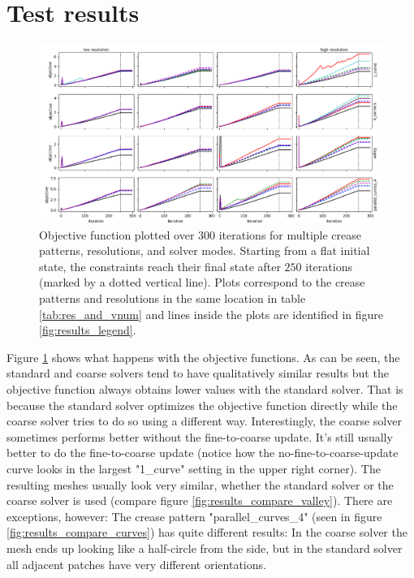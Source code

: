 \documentclass[a4paper,twoside,12pt,nochapterprefix]{scrbook}
\begin{document}
\section{Test results}\label{sec:test_results}
\begin{figure}
    \centering
    \includegraphics[width=1\linewidth]{figures/0318_plotblock}
    \caption{Objective function plotted over $300$ iterations for multiple crease patterns, resolutions, and solver modes. Starting from a flat initial state, the constraints reach their final state after $250$ iterations (marked by a dotted vertical line). Plots correspond to the crease patterns and resolutions in the same location in table \ref{tab:res_and_vnum} and lines inside the plots are identified in figure \ref{fig:results_legend}.}
      \label{fig:results_plotblock}
\end{figure}
Figure \ref{fig:results_plotblock} shows what happens with the objective functions. As can be seen, the standard and coarse solvers tend to have qualitatively similar results but the objective function always obtains lower values with the standard solver. That is because the standard solver optimizes the objective function directly while the coarse solver tries to do so using a different way. Interestingly, the coarse solver sometimes performs better without the fine-to-coarse update. It's still usually better to do the fine-to-coarse update (notice how the no-fine-to-coarse-update curve looks in the largest "1\_curve" setting in the upper right corner).\newline
The resulting meshes usually look very similar, whether the standard solver or the coarse solver is used (compare figure \ref{fig:results_compare_valley}). There are exceptions, however: The crease pattern "parallel\_curves\_4" (seen in figure \ref{fig:results_compare_curves}) has quite different results: In the coarse solver the mesh ends up looking like a half-circle from the side, but in the standard solver all adjacent patches have very different orientations.\newline %
\end{document}
